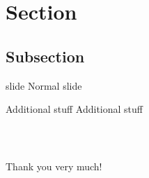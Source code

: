\documentclass[10pt]{beamer}
\begin{document}
\section{Section}

\subsection{Subsection}

\begin{frame}{slide}
    Normal slide
\end{frame}

\appendix


\begin{frame}{Additional stuff}
    Additional stuff
\end{frame}

\begin{frame}[standout] 
    \frametitle{~}
    \vspace*{-\headheight}
    Thank you very much! 
\end{frame} 
\end{document}
